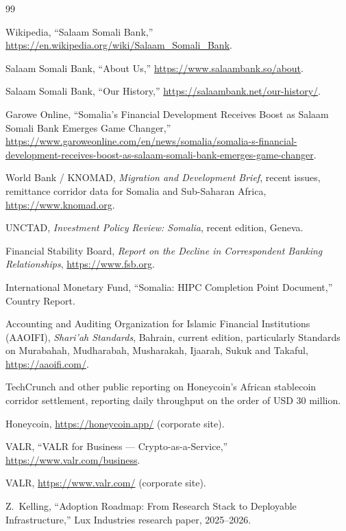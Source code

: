 \documentclass[11pt,letterpaper]{article}
\begin{document}
\begin{thebibliography}{99}\small

Wikipedia, ``Salaam Somali Bank,''
\url{https://en.wikipedia.org/wiki/Salaam_Somali_Bank}.

Salaam Somali Bank, ``About Us,''
\url{https://www.salaambank.so/about}.

Salaam Somali Bank, ``Our History,''
\url{https://salaambank.net/our-history/}.

Garowe Online, ``Somalia's Financial Development Receives Boost as
Salaam Somali Bank Emerges Game Changer,''
\url{https://www.garoweonline.com/en/news/somalia/somalia-s-financial-development-receives-boost-as-salaam-somali-bank-emerges-game-changer}.

World Bank / KNOMAD, \emph{Migration and Development Brief}, recent
issues, remittance corridor data for Somalia and Sub-Saharan Africa,
\url{https://www.knomad.org}.

UNCTAD, \emph{Investment Policy Review: Somalia}, recent edition,
Geneva.

Financial Stability Board, \emph{Report on the Decline in
Correspondent Banking Relationships}, \url{https://www.fsb.org}.

International Monetary Fund, ``Somalia: HIPC Completion Point
Document,'' Country Report.

Accounting and Auditing Organization for Islamic Financial
Institutions (AAOIFI), \emph{Shari'ah Standards}, Bahrain, current
edition, particularly Standards on Murabahah, Mudharabah, Musharakah,
Ijaarah, Sukuk and Takaful, \url{https://aaoifi.com/}.

TechCrunch and other public reporting on Honeycoin's African
stablecoin corridor settlement, reporting daily throughput on the
order of USD 30 million.

Honeycoin, \url{https://honeycoin.app/} (corporate site).

VALR, ``VALR for Business --- Crypto-as-a-Service,''
\url{https://www.valr.com/business}.

VALR, \url{https://www.valr.com/} (corporate site).

Z.\ Kelling, ``Adoption Roadmap: From Research Stack to Deployable
Infrastructure,'' Lux Industries research paper, 2025--2026.

\end{thebibliography}
\end{document}
